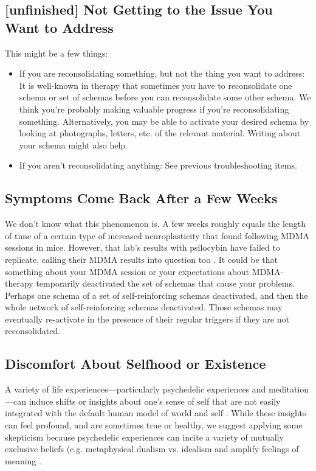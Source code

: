 \documentclass[12pt,letterpaper]{book}
\begin{document}
\subsection*{[unfinished] Not Getting to the Issue You Want to Address}
This might be a few things:
\begin{itemize}
    \item If you are reconsolidating something, but not the thing you want to address: It is well-known in therapy that sometimes you have to reconsolidate one schema or set of schemas before you can reconsolidate some other schema. We think you're probably making valuable progress if you're reconsolidating something. Alternatively, you may be able to activate your desired schema by looking at photographs, letters, etc. of the relevant material. Writing about your schema might also help.
    \item If you aren't reconsolidating anything: See previous troubleshooting items.
\end{itemize}
\subsection*{Symptoms Come Back After a Few Weeks}
We don't know what this phenomenon is. A few weeks roughly equals the length of time of a certain type of increased neuroplasticity that \textcite{nardouMDMAPlasticity} found following MDMA sessions in mice. However, that lab's results with psilocybin have failed to replicate, calling their MDMA results into question too \cite{Lu2025noplasticity}. It could be that something about your MDMA session or your expectations about MDMA-therapy temporarily deactivated the set of schemas that cause your problems. Perhaps one schema of a set of self-reinforcing schemas deactivated, and then the whole network of self-reinforcing schemas deactivated. Those schemas may eventually re-activate in the presence of their regular triggers if they are not reconsolidated.
\label{selfinsight}
\subsection*{Discomfort About Selfhood or Existence}
A variety of life experiences—particularly psychedelic experiences and meditation—can induce shifts or insights about one's sense of self that are not easily integrated with the default human model of world and self \cite{evans2020}. While these insights can feel profound, and are sometimes true or healthy, we suggest applying some skepticism because psychedelic experiences can incite a variety of mutually exclusive beliefs (e.g. metaphysical dualism vs. idealism  \cite{timmermann2021metaphysics} and amplify feelings of meaning \cite{hartogsohn2018meaning}.
\end{document}
